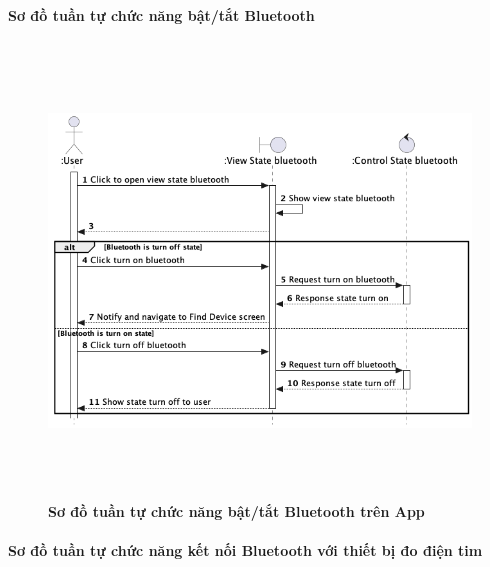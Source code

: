 \documentclass{article}%
\begin{document}
\paragraph{Sơ đồ tuần tự chức năng bật/tắt Bluetooth}
\mbox{}

  \begin{figure}[H]
        \centering
        \includegraphics[width=16cm,height=12cm]{Images/mobile_app/turn_on_off_bluetooth.png}
        \caption[Sơ đồ tuần tự chức năng bật/tắt Bluetooth trên App]{\bfseries \fontsize{12pt}{0pt}
        \selectfont Sơ đồ tuần tự chức năng bật/tắt Bluetooth trên App}
        \label{hinh21} %
  \end{figure}


\paragraph{Sơ đồ tuần tự chức năng kết nối Bluetooth với thiết bị đo điện tim}
\mbox{}
\end{document}
